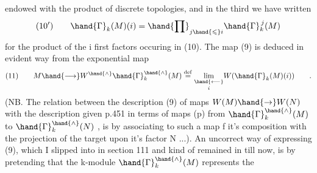 \unsure{(}endowed with the product of discrete topologies\unsure{)},  and in the third
we have written
\[ (10') \qquad \hand{\Gamma}_k(M)(i) = \hand{\prod}_{j \hand{\leqslant} i} \hand{\Gamma}_k^{\,j}(M) \]
for the product of the i first factors occuring in (10).   The map (9)
is  deduced in evident way from the exponential map
\[ (11) \qquad M \hand{\longrightarrow} W^{\hand{\wedge}}\hand{\Gamma}_k^{\hand{\wedge}}(M) \overset{\mathrm{def}}{=} \underset{i}{\underset{\hand{\longleftarrow}}{\mathrm{lim}}} W(\hand{\Gamma}_k(M)(i)) \qquad . \]
(NB.  The relation between the description (9) of maps $W(M) \hand{\rightarrow} W(N)$ with
the description given p.451  in terms of maps (p) from $\hand{\Gamma}_k^{\hand{\wedge}}(M)$ to
$\hand{\Gamma}_k^{\hand{\wedge}}(N)$ ,  is by associating to such a map f it's composition with the
projection of the target upon it's factor N ...).  An uncorrect way of
expressing (9),  which I slipped into in section 111 and kind of remained
in till now,  is by pretending that the k-module  $\hand{\Gamma}_k^{\hand{\wedge}}(M)$ represents the


